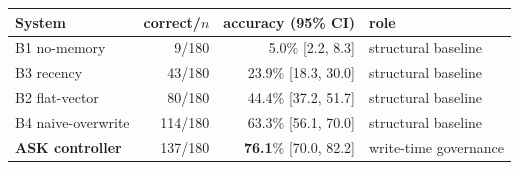 \begin{tabular}{@{}l r r l@{}}
\toprule
System & correct/$n$ & accuracy (95\% CI) & role \\
\midrule
B1 no-memory & 9/180 & 5.0\% [2.2, 8.3] & structural baseline \\
B3 recency & 43/180 & 23.9\% [18.3, 30.0] & structural baseline \\
B2 flat-vector & 80/180 & 44.4\% [37.2, 51.7] & structural baseline \\
B4 naive-overwrite & 114/180 & 63.3\% [56.1, 70.0] & structural baseline \\
\textbf{ASK controller} & 137/180 & \textbf{76.1}\% [70.0, 82.2] & write-time governance \\
\bottomrule
\end{tabular}